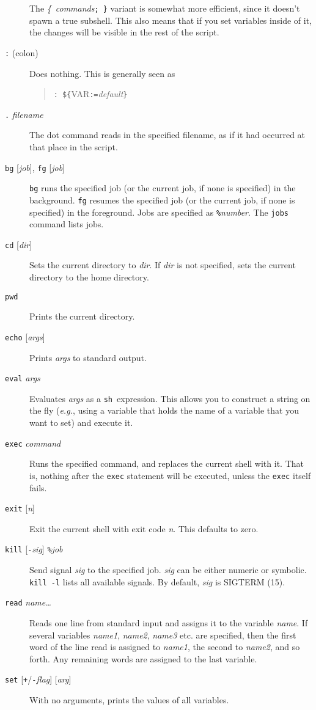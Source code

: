 \documentclass{article}
\newcommand{\code}[1]{\texttt{#1}}
\newcommand{\sh}{\code{sh}}
\begin{document}
\begin{description}
	The \textit{\{}~\textit{commands}\code{; \}} variant is
	somewhat more efficient, since it doesn't spawn a true
	subshell. This also means that if you set variables inside of
	it, the changes will be visible in the rest of the script.
\item[\code{:} (colon)]
	Does nothing. This is generally seen as
	\begin{quote}
	\code{: \$\{}VAR\code{:=}\textit{default}\code{\}}
	\end{quote}
\item[\code{.} \textit{filename}]
	The dot command reads in the specified filename, as if it had
	occurred at that place in the script.
\item[\code{bg} {[\textit{job}]}, \code{fg} {[\textit{job}]}]
	\code{bg} runs the specified job (or the current job, if none
	is specified) in the background. \code{fg} resumes the
	specified job (or the current job, if none is specified) in
	the foreground. Jobs are specified as
	\code{\%}\textit{number}. The \code{jobs} command lists jobs.
\item[\code{cd} {[\textit{dir}]}]
	Sets the current directory to \textit{dir}. If \textit{dir} is
	not specified, sets the current directory to the home
	directory.
\item[\code{pwd}]
	Prints the current directory.
\item[\code{echo} {[\textit{args}]}]
	Prints \textit{args} to standard output.
\item[\code{eval} \textit{args}]
	Evaluates \textit{args} as a \sh\ expression. This allows you
	to construct a string on the fly (\textit{e.g.}, using a
	variable that holds the name of a variable that you want to
	set) and execute it.
\item[\code{exec} \textit{command}]
	Runs the specified command, and replaces the current shell
	with it. That is, nothing after the \code{exec} statement will
	be executed, unless the \code{exec} itself fails.
\item[\code{exit} {[\textit{n}]}]
	Exit the current shell with exit code \textit{n}. This
	defaults to zero.
\item[\code{kill} {[\code{-}\textit{sig}]} \code{\%}\textit{job}]
	Send signal \textit{sig} to the specified job. \textit{sig}
	can be either numeric or symbolic. \code{kill -l} lists all
	available signals. By default, \textit{sig} is SIGTERM (15).
\item[\code{read} \textit{name\ldots}]
	Reads one line from standard input and assigns it to the
	variable \textit{name}. If several variables \textit{name1},
	\textit{name2}, \textit{name3} etc. are specified, then the
	first word of the line read is assigned to \textit{name1}, the
	second to \textit{name2}, and so forth. Any remaining words
	are assigned to the last variable.
\item[\code{set} {[\code{+}/\code{-}\textit{flag}]} {[\textit{arg}]}]
	With no arguments, prints the values of all variables.


\end{description}
\end{document}
